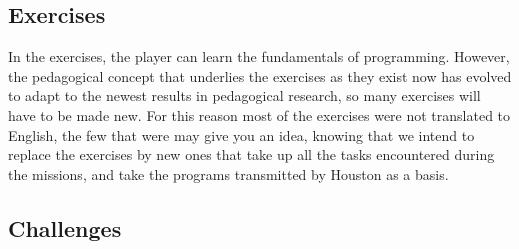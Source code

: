 

\subsection{Exercises}

In the exercises, the player can learn the fundamentals of programming. However, the pedagogical concept that underlies the exercises as they exist now has evolved to adapt to the newest results in pedagogical research, so many exercises will have to be made new. For this reason most of the exercises were not translated to English, the few that were may give you an idea, knowing that we intend to replace the exercises by new ones that take up all the tasks encountered during the missions, and take the programs transmitted by Houston as a basis.


\subsection{Challenges}


